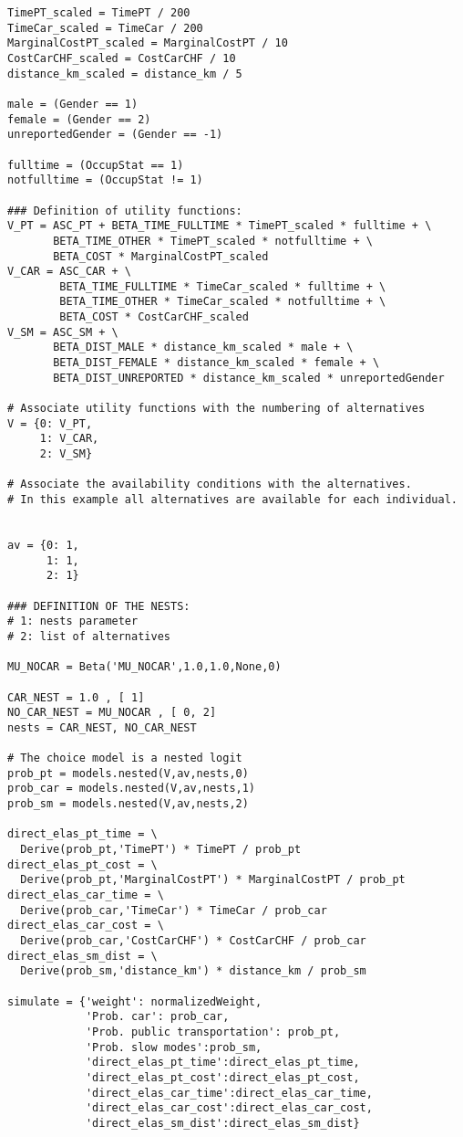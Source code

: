 \documentclass[12pt,a4paper]{article}
\begin{document}
\begin{lstlisting}[style=numbers]
TimePT_scaled = TimePT / 200
TimeCar_scaled = TimeCar / 200
MarginalCostPT_scaled = MarginalCostPT / 10
CostCarCHF_scaled = CostCarCHF / 10
distance_km_scaled = distance_km / 5

male = (Gender == 1)
female = (Gender == 2)
unreportedGender = (Gender == -1)

fulltime = (OccupStat == 1)
notfulltime = (OccupStat != 1)

### Definition of utility functions:
V_PT = ASC_PT + BETA_TIME_FULLTIME * TimePT_scaled * fulltime + \
       BETA_TIME_OTHER * TimePT_scaled * notfulltime + \
       BETA_COST * MarginalCostPT_scaled
V_CAR = ASC_CAR + \
        BETA_TIME_FULLTIME * TimeCar_scaled * fulltime + \
        BETA_TIME_OTHER * TimeCar_scaled * notfulltime + \
        BETA_COST * CostCarCHF_scaled
V_SM = ASC_SM + \
       BETA_DIST_MALE * distance_km_scaled * male + \
       BETA_DIST_FEMALE * distance_km_scaled * female + \
       BETA_DIST_UNREPORTED * distance_km_scaled * unreportedGender

# Associate utility functions with the numbering of alternatives
V = {0: V_PT,
     1: V_CAR,
     2: V_SM}

# Associate the availability conditions with the alternatives.
# In this example all alternatives are available for each individual.


av = {0: 1,
      1: 1,
      2: 1}

### DEFINITION OF THE NESTS:
# 1: nests parameter
# 2: list of alternatives

MU_NOCAR = Beta('MU_NOCAR',1.0,1.0,None,0)

CAR_NEST = 1.0 , [ 1]
NO_CAR_NEST = MU_NOCAR , [ 0, 2]
nests = CAR_NEST, NO_CAR_NEST

# The choice model is a nested logit
prob_pt = models.nested(V,av,nests,0)
prob_car = models.nested(V,av,nests,1)
prob_sm = models.nested(V,av,nests,2)

direct_elas_pt_time = \
  Derive(prob_pt,'TimePT') * TimePT / prob_pt 
direct_elas_pt_cost = \
  Derive(prob_pt,'MarginalCostPT') * MarginalCostPT / prob_pt 
direct_elas_car_time = \
  Derive(prob_car,'TimeCar') * TimeCar / prob_car 
direct_elas_car_cost = \
  Derive(prob_car,'CostCarCHF') * CostCarCHF / prob_car 
direct_elas_sm_dist = \
  Derive(prob_sm,'distance_km') * distance_km / prob_sm

simulate = {'weight': normalizedWeight,
            'Prob. car': prob_car,
            'Prob. public transportation': prob_pt,
            'Prob. slow modes':prob_sm,
            'direct_elas_pt_time':direct_elas_pt_time,
            'direct_elas_pt_cost':direct_elas_pt_cost,
            'direct_elas_car_time':direct_elas_car_time,
            'direct_elas_car_cost':direct_elas_car_cost,
            'direct_elas_sm_dist':direct_elas_sm_dist}


\end{lstlisting}
\end{document}
